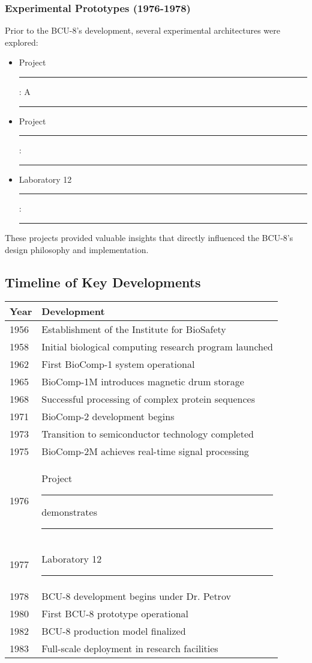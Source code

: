 \documentclass[12pt]{article}
\begin{document}
\subsubsection{Experimental Prototypes (1976-1978)}
Prior to the BCU-8's development, several experimental architectures were explored:
\begin{itemize}
    \item Project \rule{35mm}{3.5mm}: A \rule{65mm}{3.5mm}
    \item Project \rule{40mm}{3.5mm}: \rule{70mm}{3.5mm}
    \item Laboratory 12 \rule{45mm}{3.5mm}: \rule{75mm}{3.5mm}
\end{itemize}

These projects provided valuable insights that directly influenced the BCU-8's design philosophy and implementation.

\subsection{Timeline of Key Developments}
\begin{center}
\begin{tabular}{|l|l|}
\hline
\textbf{Year} & \textbf{Development} \\
\hline
1956 & Establishment of the Institute for BioSafety \\
1958 & Initial biological computing research program launched \\
1962 & First BioComp-1 system operational \\
1965 & BioComp-1M introduces magnetic drum storage \\
1968 & Successful processing of complex protein sequences \\
1971 & BioComp-2 development begins \\
1973 & Transition to semiconductor technology completed \\
1975 & BioComp-2M achieves real-time signal processing \\
1976 & Project \rule{35mm}{3.5mm} demonstrates \rule{55mm}{3.5mm} \\
1977 & Laboratory 12 \rule{75mm}{3.5mm} \\
1978 & BCU-8 development begins under Dr. Petrov \\
1980 & First BCU-8 prototype operational \\
1982 & BCU-8 production model finalized \\
1983 & Full-scale deployment in research facilities \\
\hline
\end{tabular}
\end{center}
\end{document}
